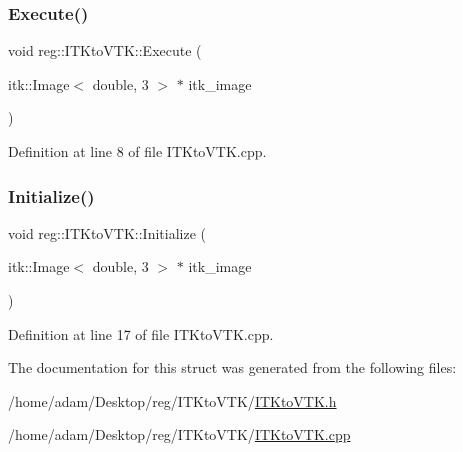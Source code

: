 \subsubsection{\texorpdfstring{Execute()}{Execute()}}
{\footnotesize\ttfamily void reg\+::\+I\+T\+Kto\+V\+T\+K\+::\+Execute (\begin{DoxyParamCaption}\item[{itk\+::\+Image$<$ double, 3 $>$ $\ast$}]{itk\+\_\+image }\end{DoxyParamCaption})}



Definition at line 8 of file I\+T\+Kto\+V\+T\+K.\+cpp.

\mbox{\label{structreg_1_1_i_t_kto_v_t_k_ab3e02f695618ce6ca0bb577b1cc97e7b}} 
\subsubsection{\texorpdfstring{Initialize()}{Initialize()}}
{\footnotesize\ttfamily void reg\+::\+I\+T\+Kto\+V\+T\+K\+::\+Initialize (\begin{DoxyParamCaption}\item[{itk\+::\+Image$<$ double, 3 $>$ $\ast$}]{itk\+\_\+image }\end{DoxyParamCaption})}



Definition at line 17 of file I\+T\+Kto\+V\+T\+K.\+cpp.



The documentation for this struct was generated from the following files\+:\begin{DoxyCompactItemize}
\item 
/home/adam/\+Desktop/reg/\+I\+T\+Kto\+V\+T\+K/\hyperlink{_i_t_kto_v_t_k_8h}{I\+T\+Kto\+V\+T\+K.\+h}\item 
/home/adam/\+Desktop/reg/\+I\+T\+Kto\+V\+T\+K/\hyperlink{_i_t_kto_v_t_k_8cpp}{I\+T\+Kto\+V\+T\+K.\+cpp}\end{DoxyCompactItemize}
